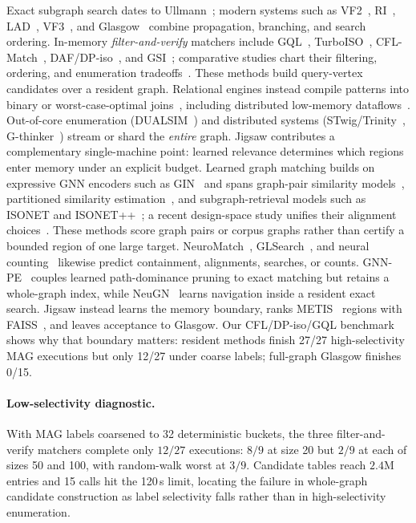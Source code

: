 \documentclass{article}
\begin{document}
Exact subgraph search dates to Ullmann~\cite{ref_ullmann}; modern systems such as VF2~\cite{ref_vf2}, RI~\cite{ref_ri}, LAD~\cite{ref_lad}, VF3~\cite{ref_vf3}, and Glasgow~\cite{ref_glasgow} combine propagation, branching, and search ordering. In-memory \emph{filter-and-verify} matchers include GQL~\cite{ref_graphql}, TurboISO~\cite{ref_turboiso}, CFL-Match~\cite{ref_cflmatch}, DAF/DP-iso~\cite{ref_daf}, and GSI~\cite{ref_gsi}; comparative studies chart their filtering, ordering, and enumeration tradeoffs~\cite{ref_survey,ref_survey2024}. These methods build query-vertex candidates over a resident graph. Relational engines instead compile patterns into binary or worst-case-optimal joins~\cite{ref_wcoj}, including distributed low-memory dataflows~\cite{ref_lowmem}. Out-of-core enumeration (DUALSIM~\cite{ref_dualsim}) and distributed systems (STwig/Trinity~\cite{ref_trinity}, G-thinker~\cite{ref_gthinker}) stream or shard the \emph{entire} graph. Jigsaw contributes a complementary single-machine point: learned relevance determines which regions enter memory under an explicit budget. Learned graph matching builds on expressive GNN encoders such as GIN~\cite{ref_gin} and spans graph-pair similarity models~\cite{ref_simgnn,ref_gmn}, partitioned similarity estimation~\cite{ref_psimgnn}, and subgraph-retrieval models such as ISONET and ISONET++~\cite{ref_isonet,ref_isonetpp}; a recent design-space study unifies their alignment choices~\cite{ref_neuraldesign}. These methods score graph pairs or corpus graphs rather than certify a bounded region of one large target. NeuroMatch~\cite{ref_neuromatch}, GLSearch~\cite{ref_glsearch}, and neural counting~\cite{ref_nsic} likewise predict containment, alignments, searches, or counts. GNN-PE~\cite{ref_gnnpe} couples learned path-dominance pruning to exact matching but retains a whole-graph index, while NeuGN~\cite{ref_neugn} learns navigation inside a resident exact search. Jigsaw instead learns the memory boundary, ranks METIS~\cite{ref_metis} regions with FAISS~\cite{ref_faiss}, and leaves acceptance to Glasgow. Our CFL/DP-iso/GQL benchmark shows why that boundary matters: resident methods finish 27/27 high-selectivity MAG executions but only 12/27 under coarse labels; full-graph Glasgow finishes 0/15.

\paragraph{Low-selectivity diagnostic.} With MAG labels coarsened to 32 deterministic buckets, the three filter-and-verify matchers complete only $12/27$ executions: $8/9$ at size 20 but $2/9$ at each of sizes 50 and 100, with random-walk worst at $3/9$. Candidate tables reach $2.4$M entries and 15 calls hit the 120\,s limit, locating the failure in whole-graph candidate construction as label selectivity falls rather than in high-selectivity enumeration.
\end{document}

